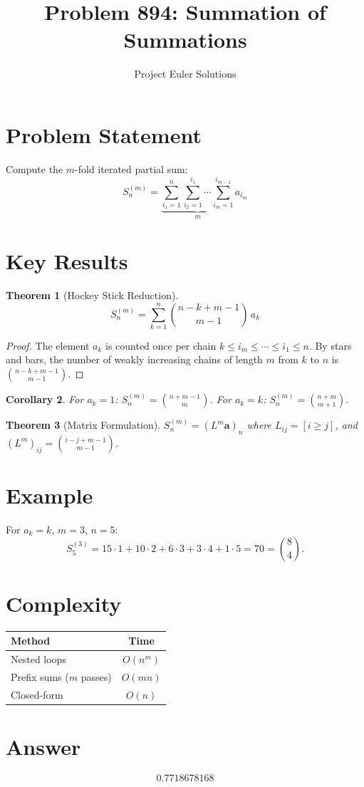\documentclass[11pt]{article}
\title{Problem 894: Summation of Summations}
\author{Project Euler Solutions}
\date{}
\newtheorem{theorem}{Theorem}
\newtheorem{corollary}[theorem]{Corollary}
\begin{document}
\maketitle

\section{Problem Statement}
Compute the $m$-fold iterated partial sum:
\[
S^{(m)}_n = \underbrace{\sum_{i_1=1}^{n}\sum_{i_2=1}^{i_1}\cdots\sum_{i_m=1}^{i_{m-1}}}_{m} a_{i_m}
\]

\section{Key Results}

\begin{theorem}[Hockey Stick Reduction]
\[
S^{(m)}_n = \sum_{k=1}^{n} \binom{n-k+m-1}{m-1}\, a_k
\]
\end{theorem}

\begin{proof}
The element $a_k$ is counted once per chain $k \le i_m \le \cdots \le i_1 \le n$. By stars and bars, the number of weakly increasing chains of length $m$ from $k$ to $n$ is $\binom{n-k+m-1}{m-1}$.
\end{proof}

\begin{corollary}
For $a_k = 1$: $S^{(m)}_n = \binom{n+m-1}{m}$. For $a_k = k$: $S^{(m)}_n = \binom{n+m}{m+1}$.
\end{corollary}

\begin{theorem}[Matrix Formulation]
$S^{(m)}_n = (L^m \mathbf{a})_n$ where $L_{ij} = [i \ge j]$, and $(L^m)_{ij} = \binom{i-j+m-1}{m-1}$.
\end{theorem}

\section{Example}
For $a_k=k$, $m=3$, $n=5$:
\[
S^{(3)}_5 = 15\cdot 1 + 10\cdot 2 + 6\cdot 3 + 3\cdot 4 + 1\cdot 5 = 70 = \binom{8}{4}.
\]

\section{Complexity}
\begin{center}
\begin{tabular}{l|c}
Method & Time \\ \hline
Nested loops & $O(n^m)$ \\
Prefix sums ($m$ passes) & $O(mn)$ \\
Closed-form & $O(n)$
\end{tabular}
\end{center}

\section{Answer}

\[
\boxed{0.7718678168}
\]
\end{document}
